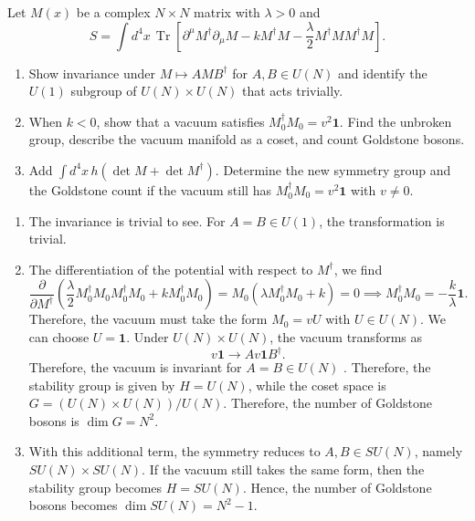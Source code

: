 Let $M(x)$ be a complex $N\times N$ matrix with $\lambda>0$ and
\begin{equation}
    S=\int d^4x\,\operatorname{Tr}\left[
    \partial^\mu M^\dagger\partial_\mu M
    -kM^\dagger M-\frac\lambda2M^\dagger M M^\dagger M\right].
\end{equation}
\begin{enumerate}[label=\roman*)]
    \item Show invariance under $M\mapsto AMB^\dagger$ for
    $A,B\in U(N)$ and identify the $U(1)$ subgroup of
    $U(N)\times U(N)$ that acts trivially.
    \item When $k<0$, show that a vacuum satisfies
    $M_0^\dagger M_0=v^2\mathbf1$. Find the unbroken group,
    describe the vacuum manifold as a coset, and count Goldstone bosons.
    \item Add
    $\int d^4x\,h(\det M+\det M^\dagger)$.
    Determine the new symmetry group and the Goldstone count if the
    vacuum still has $M_0^\dagger M_0=v^2\mathbf1$ with $v\ne0$.
\end{enumerate}
\begin{solution}
    \begin{enumerate}[label=\roman*)]
    \item  The invariance is trivial to see. For $A = B \in U(1)$, the transformation is trivial.
    \item The differentiation of the potential with respect to $M^\dagger$, we find
    \begin{equation}
        \frac{\partial}{\partial M^\dagger}\left(\frac{\lambda}{2}M_0^\dagger M_0 M_0^\dagger M_0 + k M_0^\dagger M_0\right) = M_0 (\lambda M_0^\dagger M_0 + k ) = 0 \implies M_0^\dagger M_0 = -\frac{k}{\lambda}\mathbf{1}.
    \end{equation}
    Therefore, the vacuum must take the form $M_0 = v U$ with $U \in U(N)$. We can choose $U = \mathbf{1}$.
    Under $U(N) \times U(N)$, the vacuum transforms as
    \begin{equation}
        v\mathbf{1} \to  A v\mathbf{1} B^\dagger.
    \end{equation}
    Therefore, the vacuum is invariant for $A = B \in U(N)$ . Therefore, the stability group is given by $H = U(N)$, while the coset space is $G = (U(N)\times U(N))/U(N) $. Therefore, the number of Goldstone bosons is $\dim G = N^2$.
    \item With this additional term, the symmetry reduces to $A, B \in SU(N)$, namely $SU(N) \times SU(N)$. If the vacuum still takes the same form, then the stability group becomes $H = SU(N)$. Hence, the number of Goldstone bosons becomes $\dim SU(N) = N^2 -1$.
    \end{enumerate}
\end{solution}

